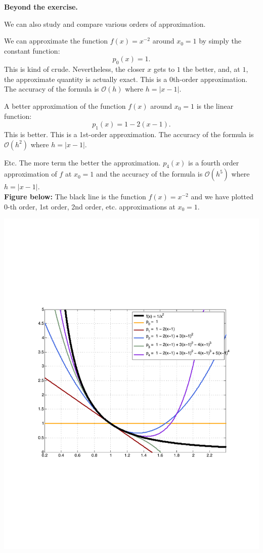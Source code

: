 \documentclass[pdftex,11pt]{article}
\begin{document}
\textbf{\color{blue} Beyond the exercise.} 

We can also study and compare various orders of approximation.

We can approximate the function $f(x)=x^{-2}$ around $x_0=1$ by simply the constant function:
$$p_0(x) = 1.$$ 
This is kind of crude. Nevertheless, the closer $x$ gets to $1$ the better, and, at $1$, the approximate quantity is actually exact. 
This is a 0th-order approximation. The accuracy of the formula is $\mathcal{O}(h)$ where $h=|x-1|$.

A better approximation of the function $f(x)$ around $x_0=1$ is the linear function:
$$p_1(x) =  1 - 2 (x-1).$$
This is better. 
This is a 1st-order approximation. The accuracy of the formula is $\mathcal{O}(h^2)$  where $h=|x-1|$.

Etc. The more term the better the approximation. $p_4(x)$ is a fourth order approximation of $f$ at $x_0=1$  and the accuracy of the formula is $\mathcal{O}(h^5)$  where $h=|x-1|$.\\

\textbf{Figure below:} The black line is the function $f(x)=x^{-2}$ and we have plotted 0-th order, 1st order, 2nd order, etc. approximations at  $x_0=1$.

\includegraphics[width=.7\textwidth]{sauer-exercise-0-5-6/EX_0_5_6_fig4}
\end{document}
